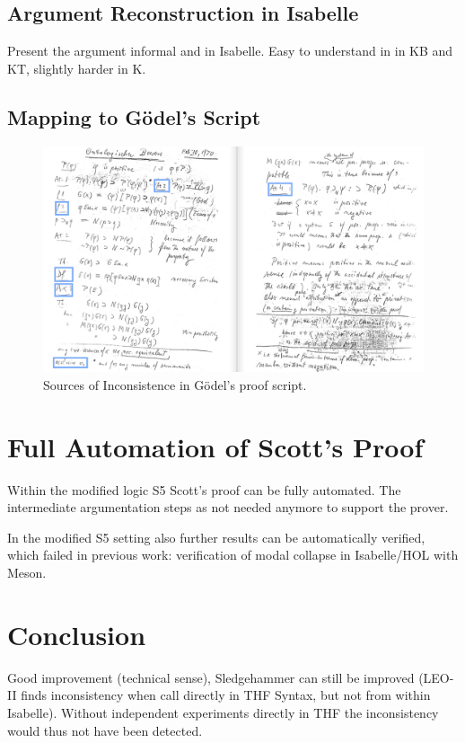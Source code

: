 \documentclass{article}
\begin{document}
\subsection{Argument Reconstruction in Isabelle}
Present the argument informal and in Isabelle. Easy to understand in 
in KB and KT, slightly harder in K.

\subsection{Mapping to Gödel's Script}
\begin{figure}
\centerline{\includegraphics[width=\textwidth]{./Images/Manuscript2.png}}
\caption{Sources of Inconsistence in G\"{o}del's proof script.} \label{GoedelScript}
\end{figure}

\section{Full Automation of Scott's Proof}
Within the modified logic S5 Scott's proof can be fully automated. The
intermediate argumentation steps as not needed anymore to support the
prover.

In the modified S5 setting also further results can be automatically verified, which 
failed in previous work: verification of  modal collapse in
Isabelle/HOL with Meson.

\section{Conclusion}


Good improvement (technical sense), Sledgehammer can still be improved
(LEO-II finds inconsistency when call directly in THF Syntax, but not
from within Isabelle). Without independent experiments directly in THF 
the inconsistency would thus not have been detected.
\end{document}
